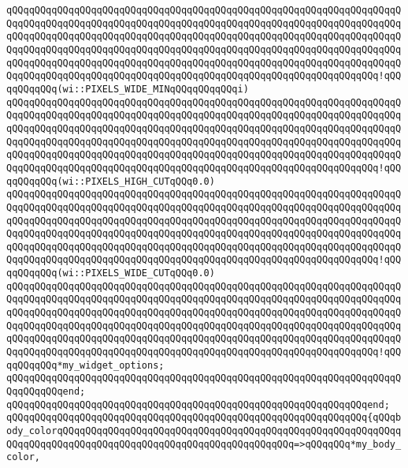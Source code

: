 \verb|qQQqqQQqqQQqqQQqqQQqqQQqqQQqqQQqqQQqqQQqqQQqqQQqqQQqqQQqqQQqqQQqqQQqqQQqqQQqqQQqqQQqqQQqqQQqqQQqqQQqqQQqqQQqqQQqqQQqqQQqqQQqqQQqqQQqqQQqqQQqqQQqqQQqqQQqqQQqqQQqqQQqqQQqqQQqqQQqqQQqqQQqqQQqqQQqqQQqqQQqqQQqqQQqqQQqqQQqqQQqqQQqqQQqqQQqqQQqqQQqqQQqqQQqqQQqqQQqqQQqqQQqqQQqqQQqqQQqqQQqqQQqqQQqqQQqqQQqqQQqqQQqqQQqqQQqqQQqqQQqqQQqqQQqqQQqqQQqqQQqqQQqqQQqqQQqqQQqqQQqqQQqqQQqqQQqqQQqqQQqqQQqqQQqqQQqqQQqqQQqqQQqqQQqqQQqqQQq!qQQqqQQqqQQq(wi::PIXELS_WIDE_MINqQQqqQQqqQQqi)|\newline
\verb|qQQqqQQqqQQqqQQqqQQqqQQqqQQqqQQqqQQqqQQqqQQqqQQqqQQqqQQqqQQqqQQqqQQqqQQqqQQqqQQqqQQqqQQqqQQqqQQqqQQqqQQqqQQqqQQqqQQqqQQqqQQqqQQqqQQqqQQqqQQqqQQqqQQqqQQqqQQqqQQqqQQqqQQqqQQqqQQqqQQqqQQqqQQqqQQqqQQqqQQqqQQqqQQqqQQqqQQqqQQqqQQqqQQqqQQqqQQqqQQqqQQqqQQqqQQqqQQqqQQqqQQqqQQqqQQqqQQqqQQqqQQqqQQqqQQqqQQqqQQqqQQqqQQqqQQqqQQqqQQqqQQqqQQqqQQqqQQqqQQqqQQqqQQqqQQqqQQqqQQqqQQqqQQqqQQqqQQqqQQqqQQqqQQqqQQqqQQqqQQqqQQqqQQqqQQqqQQq!qQQqqQQqqQQq(wi::PIXELS_HIGH_CUTqQQq0.0)|\newline
\verb|qQQqqQQqqQQqqQQqqQQqqQQqqQQqqQQqqQQqqQQqqQQqqQQqqQQqqQQqqQQqqQQqqQQqqQQqqQQqqQQqqQQqqQQqqQQqqQQqqQQqqQQqqQQqqQQqqQQqqQQqqQQqqQQqqQQqqQQqqQQqqQQqqQQqqQQqqQQqqQQqqQQqqQQqqQQqqQQqqQQqqQQqqQQqqQQqqQQqqQQqqQQqqQQqqQQqqQQqqQQqqQQqqQQqqQQqqQQqqQQqqQQqqQQqqQQqqQQqqQQqqQQqqQQqqQQqqQQqqQQqqQQqqQQqqQQqqQQqqQQqqQQqqQQqqQQqqQQqqQQqqQQqqQQqqQQqqQQqqQQqqQQqqQQqqQQqqQQqqQQqqQQqqQQqqQQqqQQqqQQqqQQqqQQqqQQqqQQqqQQqqQQqqQQqqQQqqQQq!qQQqqQQqqQQq(wi::PIXELS_WIDE_CUTqQQq0.0)|\newline
\verb|qQQqqQQqqQQqqQQqqQQqqQQqqQQqqQQqqQQqqQQqqQQqqQQqqQQqqQQqqQQqqQQqqQQqqQQqqQQqqQQqqQQqqQQqqQQqqQQqqQQqqQQqqQQqqQQqqQQqqQQqqQQqqQQqqQQqqQQqqQQqqQQqqQQqqQQqqQQqqQQqqQQqqQQqqQQqqQQqqQQqqQQqqQQqqQQqqQQqqQQqqQQqqQQqqQQqqQQqqQQqqQQqqQQqqQQqqQQqqQQqqQQqqQQqqQQqqQQqqQQqqQQqqQQqqQQqqQQqqQQqqQQqqQQqqQQqqQQqqQQqqQQqqQQqqQQqqQQqqQQqqQQqqQQqqQQqqQQqqQQqqQQqqQQqqQQqqQQqqQQqqQQqqQQqqQQqqQQqqQQqqQQqqQQqqQQqqQQqqQQqqQQqqQQqqQQqqQQq!qQQqqQQqqQQq*my_widget_options;|\newline
\verb|qQQqqQQqqQQqqQQqqQQqqQQqqQQqqQQqqQQqqQQqqQQqqQQqqQQqqQQqqQQqqQQqqQQqqQQqqQQqqQQqend;|\newline
\verb|qQQqqQQqqQQqqQQqqQQqqQQqqQQqqQQqqQQqqQQqqQQqqQQqqQQqqQQqqQQqqQQqend;|\newline
\newline
\verb|qQQqqQQqqQQqqQQqqQQqqQQqqQQqqQQqqQQqqQQqqQQqqQQqqQQqqQQqqQQqqQQq{qQQqbody_colorqQQqqQQqqQQqqQQqqQQqqQQqqQQqqQQqqQQqqQQqqQQqqQQqqQQqqQQqqQQqqQQqqQQqqQQqqQQqqQQqqQQqqQQqqQQqqQQqqQQqqQQqqQQqqQQq=>qQQqqQQq*my_body_color,|\newline
